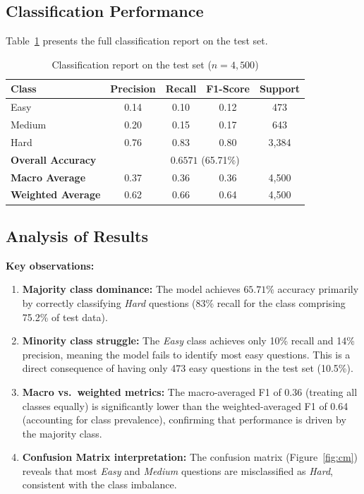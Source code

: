 \documentclass[12pt, a4paper]{article}
\begin{document}
\subsection{Classification Performance}

Table~\ref{tab:metrics} presents the full classification report on the test set.

\begin{table}[H]
\centering
\caption{Classification report on the test set ($n = 4{,}500$)}
\label{tab:metrics}
\begin{tabular}{lcccc}
\toprule
\textbf{Class} & \textbf{Precision} & \textbf{Recall} & \textbf{F1-Score} & \textbf{Support} \\
\midrule
Easy   & 0.14 & 0.10 & 0.12 & 473  \\
Medium & 0.20 & 0.15 & 0.17 & 643  \\
Hard   & 0.76 & 0.83 & 0.80 & 3{,}384 \\
\midrule
\textbf{Overall Accuracy}     & \multicolumn{4}{c}{$\mathbf{0.6571}$ (65.71\%)} \\
\textbf{Macro Average}    & 0.37 & 0.36 & 0.36 & 4{,}500 \\
\textbf{Weighted Average} & 0.62 & 0.66 & 0.64 & 4{,}500 \\
\bottomrule
\end{tabular}
\end{table}

\subsection{Analysis of Results}

\textbf{Key observations:}
\begin{enumerate}
    \item \textbf{Majority class dominance:} The model achieves $65.71\%$ accuracy primarily by correctly classifying \textit{Hard} questions (83\% recall for the class comprising 75.2\% of test data).
    
    \item \textbf{Minority class struggle:} The \textit{Easy} class achieves only 10\% recall and 14\% precision, meaning the model fails to identify most easy questions. This is a direct consequence of having only 473 easy questions in the test set (10.5\%).
    
    \item \textbf{Macro vs.\ weighted metrics:} The macro-averaged F1 of 0.36 (treating all classes equally) is significantly lower than the weighted-averaged F1 of 0.64 (accounting for class prevalence), confirming that performance is driven by the majority class.
    
    \item \textbf{Confusion Matrix interpretation:} The confusion matrix (Figure~\ref{fig:cm}) reveals that most \textit{Easy} and \textit{Medium} questions are misclassified as \textit{Hard}, consistent with the class imbalance.
\end{enumerate}
\end{document}
